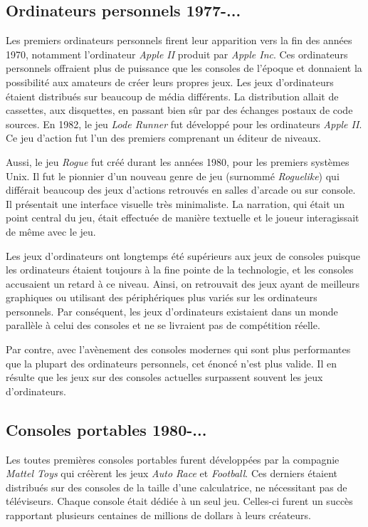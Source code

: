 \documentclass[12pt,twoside,letterpaper,francais]{book}
\newcommand{\lr}{{\textit{Lode Runner }}}
\begin{document}
\FloatBarrier
\subsection{Ordinateurs personnels 1977-...}
Les premiers ordinateurs personnels firent leur apparition vers la fin
des années 1970, notamment l'ordinateur \textit{Apple II} produit par
\textit{Apple Inc}. Ces ordinateurs personnels offraient plus de
puissance que les consoles de l'époque et donnaient la possibilité aux
amateurs de créer leurs propres jeux. Les jeux d'ordinateurs étaient
distribués sur beaucoup de média différents. La distribution allait de
cassettes, aux disquettes, en passant bien sûr par des échanges
postaux de code sources. En 1982, le jeu \lr fut développé pour les
ordinateurs \textit{Apple II}. Ce jeu d'action fut l'un des premiers
comprenant un éditeur de niveaux.

Aussi, le jeu \textit{Rogue} fut créé durant les années 1980, pour les
premiers systèmes Unix. Il fut le pionnier d'un nouveau genre de jeu
(surnommé \textit{Roguelike}) qui différait beaucoup des jeux
d'actions retrouvés en salles d'arcade ou sur console. Il présentait
une interface visuelle très minimaliste. La narration, qui était un
point central du jeu, était effectuée de manière textuelle et le
joueur interagissait de même avec le jeu.

Les jeux d'ordinateurs ont longtemps été supérieurs aux jeux de
consoles puisque les ordinateurs étaient toujours à la fine pointe de
la technologie, et les consoles accusaient un retard à ce
niveau. Ainsi, on retrouvait des jeux ayant de meilleurs graphiques ou
utilisant des périphériques plus variés sur les ordinateurs
personnels. Par conséquent, les jeux d'ordinateurs existaient dans un
monde parallèle à celui des consoles et ne se livraient pas de
compétition réelle.

Par contre, avec l'avènement des consoles modernes qui sont plus
performantes que la plupart des ordinateurs personnels, cet énoncé
n'est plus valide. Il en résulte que les jeux sur des consoles
actuelles surpassent souvent les jeux d'ordinateurs.


\FloatBarrier
\subsection{Consoles portables 1980-...}
Les toutes premières consoles portables furent développées par la
compagnie \textit{Mattel Toys} qui créèrent les jeux \textit{Auto
  Race} et \textit{Football}. Ces derniers étaient distribués sur des
consoles de la taille d'une calculatrice, ne nécessitant pas de
téléviseurs. Chaque console était dédiée à un seul jeu. Celles-ci
furent un succès rapportant plusieurs centaines de millions de dollars
à leurs créateurs.
\end{document}
